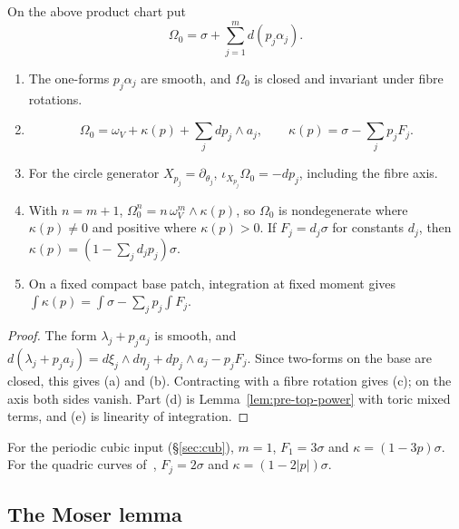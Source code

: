 \begin{lemma}\label{lem:pre-local-form}
On the above product chart put
\[
 \Omega_0=\sigma+\sum_{j=1}^md(p_j\alpha_j).
\]
\begin{enumerate}[label=(\alph*)]
\item The one-forms $p_j\alpha_j$ are smooth, and $\Omega_0$ is closed and invariant under fibre rotations.
\item
\[
 \Omega_0=\omega_V+\kappa(p)+\sum_jdp_j\wedge a_j,
 \qquad \kappa(p)=\sigma-\sum_jp_jF_j.
\]
\item For the circle generator $X_{p_j}=\partial_{\theta_j}$,
 $\iota_{X_{p_j}}\Omega_0=-dp_j$, including the fibre axis.
\item With $n=m+1$, $\Omega_0^n=n\,\omega_V^m\wedge\kappa(p)$, so $\Omega_0$ is nondegenerate where
 $\kappa(p)\ne0$ and positive where $\kappa(p)>0$. If $F_j=d_j\sigma$ for constants $d_j$, then
 $\kappa(p)=(1-\sum_jd_jp_j)\sigma$.
\item On a fixed compact base patch, integration at fixed moment gives
 $\int\kappa(p)=\int\sigma-\sum_jp_j\int F_j$.
\end{enumerate}
\end{lemma}

\begin{proof}
The form $\lambda_j+p_ja_j$ is smooth, and $d(\lambda_j+p_ja_j)=d\xi_j\wedge d\eta_j+dp_j\wedge a_j-p_jF_j$. Since two-forms on the base are closed, this gives (a) and (b). Contracting with a fibre rotation gives (c); on the axis both sides vanish. Part (d) is Lemma~\ref{lem:pre-top-power} with toric mixed terms, and (e) is linearity of integration.
\end{proof}

For the periodic cubic input (\S\ref{sec:cub}), $m=1$, $F_1=3\sigma$ and $\kappa=(1-3p)\sigma$. For the quadric curves of~\cite{SongHD}, $F_j=2\sigma$ and $\kappa=(1-2|p|)\sigma$.

\subsection{The Moser lemma}\label{sec:pre-moser}

